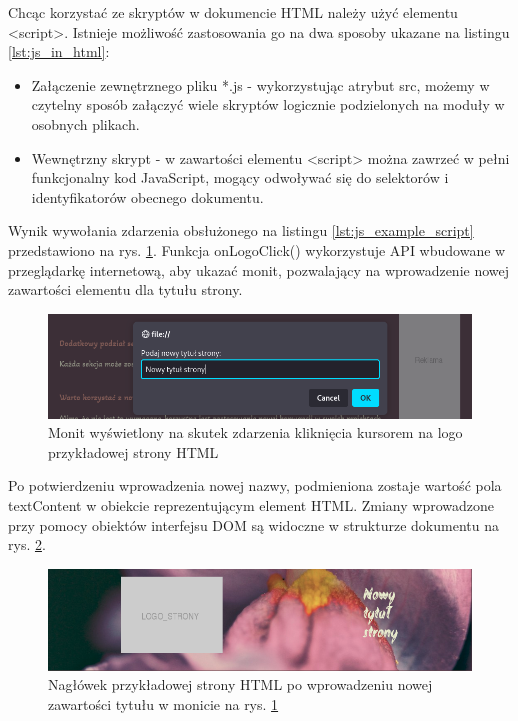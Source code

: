 Chcąc korzystać ze skryptów w dokumencie HTML należy użyć elementu <script>. Istnieje możliwość zastosowania go na dwa sposoby ukazane na listingu \ref{lst:js_in_html}:

\begin{itemize}
    \item Załączenie zewnętrznego pliku *.js - wykorzystując atrybut src, możemy w czytelny sposób załączyć wiele skryptów logicznie podzielonych na moduły w osobnych plikach.
    \item Wewnętrzny skrypt - w zawartości elementu <script> można zawrzeć w pełni funkcjonalny kod JavaScript, mogący odwoływać się do selektorów i identyfikatorów obecnego dokumentu.
\end{itemize}

Wynik wywołania zdarzenia obsłużonego na listingu \ref{lst:js_example_script} przedstawiono na rys. \ref{fig:js.example.prompt}. Funkcja onLogoClick() wykorzystuje API wbudowane w przeglądarkę internetową, aby ukazać monit, pozwalający na wprowadzenie nowej zawartości elementu dla tytułu strony.

\begin{figure}[!htbp] 
    \centering
    \includegraphics[width=\textwidth]{img/chapter3/js.example.prompt.png}
    \caption{Monit wyświetlony na skutek zdarzenia kliknięcia kursorem na logo przykładowej strony HTML}
    \label{fig:js.example.prompt}
\end{figure}

Po potwierdzeniu wprowadzenia nowej nazwy, podmieniona zostaje wartość pola textContent w obiekcie reprezentującym element HTML. Zmiany wprowadzone przy pomocy obiektów interfejsu DOM są widoczne w strukturze dokumentu na rys. \ref{fig:js.example.after_click}.

\begin{figure}[!htbp] 
    \centering
    \includegraphics[width=\textwidth]{img/chapter3/js.example.after_click.png}
    \caption{Nagłówek przykładowej strony HTML po wprowadzeniu nowej zawartości tytułu w monicie na rys. \ref{fig:js.example.prompt}}
    \label{fig:js.example.after_click}
\end{figure}

